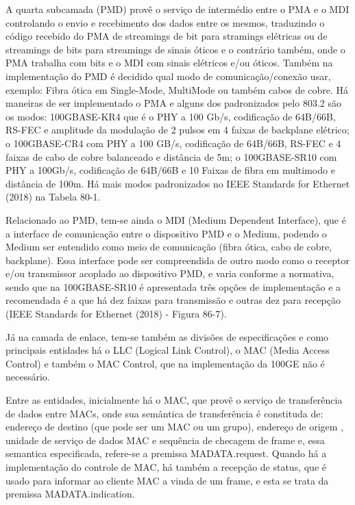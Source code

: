 \documentclass[a4paper,12pt]{article}
\begin{document}
A quarta subcamada (PMD) provê o serviço de intermédio entre o PMA e o MDI controlando o envio e recebimento dos dados entre os mesmos, traduzindo o código recebido do PMA de streamings de bit para stramings elétricas ou de streamings de bits para streamings de sinais óticos e o contrário também, onde o PMA trabalha com bits e o MDI com sinais elétricos e/ou óticos. Também na implementação do PMD é decidido qual modo de comunicação/conexão usar, exemplo: Fibra ótica em Single-Mode, MultiMode ou também cabos de cobre. Há maneiras de ser implementado o PMA e alguns dos padronizados pelo 803.2 são os modos: 100GBASE-KR4 que é o PHY a 100 Gb/s, codificação de 64B/66B, RS-FEC e amplitude da modulação de 2 pulsos em 4 faixas de backplane elétrico; o 100GBASE-CR4 com PHY a 100 GB/s, codificação de 64B/66B, RS-FEC e 4 faixas de cabo de cobre balanceado e distância de 5m; o 100GBASE-SR10 com PHY a 100Gb/s, codificação de 64B/66B e 10 Faixas de fibra em multimodo e distância de 100m. Há mais modos padronizados no IEEE Standards for Ethernet (2018) na Tabela 80-1.

Relacionado ao PMD, tem-se ainda o MDI (Medium Dependent Interface), que é a interface de comunicação entre o dispositivo PMD e o Medium, podendo o Medium ser entendido como meio de comunicação (fibra ótica, cabo de cobre, backplane). Essa interface pode ser compreendida de outro modo como o receptor e/ou transmissor acoplado ao dispositivo PMD, e varia conforme a normativa, sendo que na 100GBASE-SR10 é apresentada três opções de implementação e a recomendada é a que há dez faixas para transmissão e outras dez para recepção (IEEE Standards for Ethernet (2018) - Figura 86-7).

Já na camada de enlace, tem-se também as divisões de especificações e como principais entidades há o LLC (Logical Link Control), o MAC (Media Access Control) e também o MAC Control, que na implementação da 100GE não é necessário.

Entre as entidades, inicialmente há o MAC, que provê o serviço de transferência de dados entre MACs, onde sua semântica de transferência é constituda de: endereço de destino (que pode ser um MAC ou um grupo), endereço de origem , unidade de serviço de dados MAC e sequência de checagem de frame e, essa semantica especificada, refere-se a premissa MA\underline{\hspace*{0.14in}}DATA.request. Quando há a implementação do controle de MAC, há também a recepção de status, que é usado para informar ao cliente MAC a vinda de um frame, e esta se trata da premissa MA\underline{\hspace*{0.14in}}DATA.indication.
\end{document}
